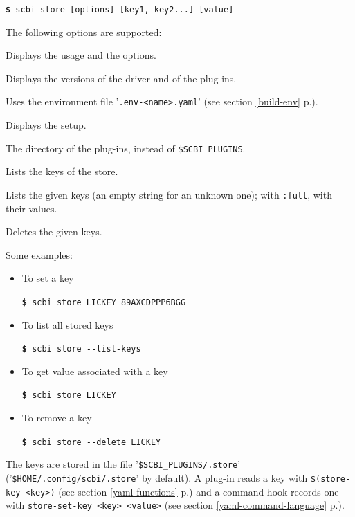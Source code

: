 \documentclass[a4paper,12pt,twoside]{article}
\newcommand{\code}[1]{\texttt{#1}}
\newcommand{\seeref}[1]{see section \ref{#1} p.\pageref{#1}}
\newcommand{\file}[1]{'{\texttt{#1}}'}
\newcommand{\cmd}[1]{\tabto{1cm}\hspace{0.5cm}\texttt{\textbf{\$} #1}}
\newcommand{\ddash}{-{}-}
\begin{document}
\cmd{scbi store [options] [key1, key2...] [value]}

The following options are supported:

\begin{description}[font=\texttt]
	\item[-h | \ddash{}help] Displays the usage and the options.

	\item[-v | \ddash{}version] Displays the versions of the driver and of the plug-ins.

	\item[-e | \ddash{}env=<name>] Uses the environment file \file{.env-<name>.yaml} (\seeref{build-env}).

	\item[\ddash{}stat] Displays the setup.

	\item[\ddash{}plugins=<directory>] The directory of the plug-ins, instead of \code{\$SCBI\_PLUGINS}.

	\item[\ddash{}list-keys] Lists the keys of the store.

	\item[\ddash{}list{[}:full{]}] Lists the given keys (an empty string for an unknown one); with \code{:full}, with their values.

	\item[-d | \ddash{}delete] Deletes the given keys.
\end{description}

Some examples:

\begin{itemize}
	\item To set a key

	\cmd{scbi store LICKEY 89AXCDPPP6BGG}

	\item To list all stored keys

	\cmd{scbi store \ddash{}list-keys}

	\item To get value associated with a key

	\cmd{scbi store LICKEY}

	\item To remove a key

    \cmd{scbi store \ddash{}delete LICKEY}
\end{itemize}

The keys are stored in the file \file{\$SCBI\_PLUGINS/.store} (\file{\$HOME/.config/scbi/.store} by default). A plug-in reads a key with \code{\$(store-key <key>)} (\seeref{yaml-functions}) and a command hook records one with \code{store-set-key <key> <value>} (\seeref{yaml-command-language}).
\end{document}
